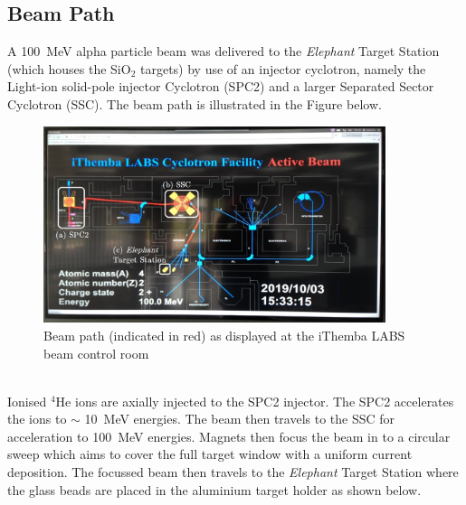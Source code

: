 \documentclass[]{article}
\begin{document}
\subsection{Beam Path}\label{beamPathSection}
A \SI{100}{\mega \electronvolt} alpha particle beam was delivered to the \textit{Elephant} Target Station (which houses the SiO$_2$ targets) by use of an injector cyclotron, namely the Light-ion solid-pole injector Cyclotron (SPC2) and a larger Separated Sector Cyclotron (SSC). The beam path is illustrated in the Figure below.

\begin{figure}[h!]
	\includegraphics[width=10cm]{beampath.JPG}
	\centering
	\caption{Beam path (indicated in red) as displayed at the iThemba LABS beam control room}
	\label{fig:beampath}
\end{figure}~\\
Ionised ${}^4$He ions are axially injected to the SPC2 injector. The SPC2 accelerates the ions to $\sim$ \SI{10}{\mega \electronvolt} energies. The beam then travels to the SSC for acceleration to \SI{100}{\mega \electronvolt} energies. Magnets then focus the beam in to a circular sweep which aims to cover the full target window with a uniform current deposition. The focussed beam then travels to the \textit{Elephant} Target Station where the glass beads are placed in the aluminium target holder as shown below.
\end{document}
